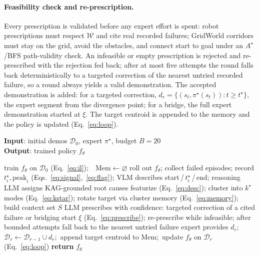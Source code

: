 \documentclass[letterpaper]{article} %
\begin{document}
\paragraph{Feasibility check and re-prescription.}
Every prescription is validated before any expert effort is spent: robot
prescriptions must respect $\mathcal{W}$ and cite real recorded failures;
GridWorld corridors must stay on the grid, avoid the obstacles, and connect
start to goal under an $A^{\!\star}$/BFS path-validity check. An infeasible or empty prescription
is rejected and re-prescribed with the rejection fed back; after at most
five attempts the round falls back deterministically to a targeted
correction of the nearest untried recorded failure, so a round always yields
a valid demonstration. The accepted demonstration is added: for a targeted
correction, $d_r=\{(s_t,\pi^\star(s_t)):t\ge t^\star\}$, the expert segment
from the divergence point; for a bridge, the full expert demonstration
started at $\xi$. The target centroid is appended to the memory and the
policy is updated (Eq.~\ref{eq:loop}).

\begin{algorithm}[tb]
\caption{The DISTIL loop (one demonstration per round).}
\label{alg:distil}
\textbf{Input}: initial demos $\mathcal{D}_0$, expert $\pi^\star$, budget
$B{=}20$\\
\textbf{Output}: trained policy $f_\theta$
\begin{algorithmic}[1]
\STATE train $f_\theta$ on $\mathcal{D}_0$ (Eq.~\ref{eq:il});\ \
$\mathrm{Mem}\leftarrow\varnothing$
  \STATE roll out $f_\theta$; collect failed episodes; record
  $t^\star_i,\mathrm{peak}_i$ (Eqs.~\ref{eq:signal},~\ref{eq:flag}); VLM
  describes start\,/\,$t^\star_i$\,/\,end; reasoning LLM assigns
  KAG-grounded root causes
  \STATE featurize (Eq.~\ref{eq:desc}); cluster into $k^\star$ modes
  (Eq.~\ref{eq:kstar}); rotate target via cluster memory
  (Eq.~\ref{eq:memory}); build context set $S$
  \STATE LLM prescribes with confidence: targeted correction of a cited
  failure or bridging start $\xi$ (Eq.~\ref{eq:prescribe}); re-prescribe
  while infeasible; after bounded attempts fall back to the nearest untried
  failure
  \STATE expert provides $d_r$;\ \
  $\mathcal{D}_r\leftarrow\mathcal{D}_{r-1}\cup d_r$;\ append target centroid
  to $\mathrm{Mem}$;\ update $f_\theta$ on $\mathcal{D}_r$ (Eq.~\ref{eq:loop})
\ENDFOR
\STATE \textbf{return} $f_\theta$
\end{algorithmic}
\end{algorithm}
\end{document}
